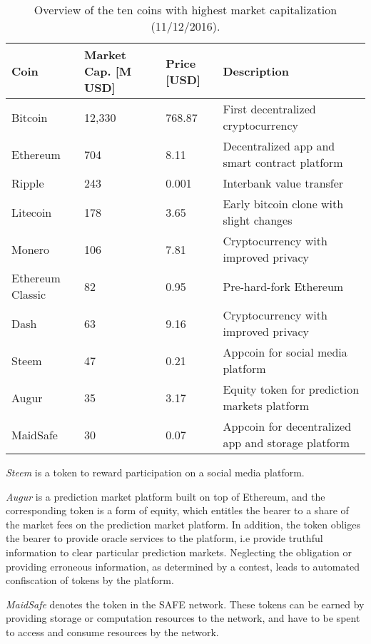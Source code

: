 \begin{table}\footnotesize
  \centering
  \begin{tabularx}{\textwidth}{ p{1.5cm} p{1.8cm} p{1cm} X }
    \toprule
    \textbf{Coin} & \textbf{Market Cap.} \newline \textbf{[M USD]} & \textbf{Price} \newline \textbf{[USD]} & \textbf{Description} \\
    \midrule
    Bitcoin & 12,330 & 768.87 & First decentralized cryptocurrency \\
    Ethereum & 704 & 8.11 & Decentralized app and smart contract platform \\
    Ripple & 243 & 0.001 & Interbank value transfer \\
    Litecoin & 178 & 3.65 & Early bitcoin clone with slight changes \\
    Monero & 106 & 7.81 & Cryptocurrency with improved privacy \\
    Ethereum \newline Classic & 82 & 0.95 & Pre-hard-fork Ethereum \\
    Dash & 63 & 9.16 & Cryptocurrency with improved privacy  \\
    Steem & 47 & 0.21 & Appcoin for social media platform\\
    Augur & 35 & 3.17 & Equity token for prediction markets platform \\
    MaidSafe & 30 & 0.07 & Appcoin for decentralized app and storage platform \\
    \bottomrule
  \end{tabularx}
  \caption{Overview of the ten coins with highest market capitalization (11/12/2016).}
  \label{tbl:eco:coin}
\end{table}

\emph{Steem} is a token to reward participation on a social media platform. 

\emph{Augur} is a prediction market platform built on top of Ethereum, and the corresponding token is a form of equity, which entitles the bearer to a share of the market fees on the prediction market platform. In addition, the token obliges the bearer to provide oracle services to the platform, i.e provide truthful information to clear particular prediction markets. Neglecting the obligation or providing erroneous information, as determined by a contest, leads to automated confiscation of tokens by the platform. 

\emph{MaidSafe} denotes the token in the SAFE network. These tokens can be earned by providing storage or computation resources to the network, and have to be spent to access and consume resources by the network.

